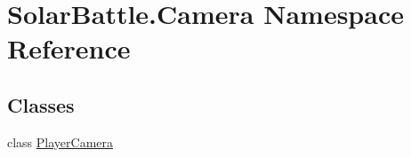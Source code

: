 \hypertarget{namespace_solar_battle_1_1_camera}{}\section{Solar\+Battle.\+Camera Namespace Reference}
\label{namespace_solar_battle_1_1_camera}
\subsection*{Classes}
\begin{DoxyCompactItemize}
\item 
class \mbox{\hyperlink{class_solar_battle_1_1_camera_1_1_player_camera}{Player\+Camera}}
\end{DoxyCompactItemize}
